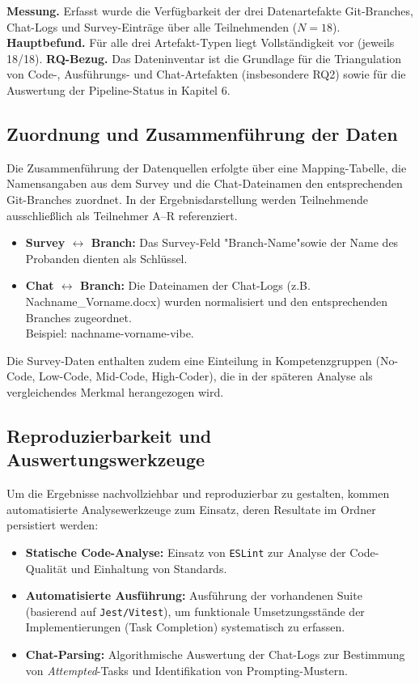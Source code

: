 \noindent \textbf{Messung.} Erfasst wurde die Verfügbarkeit der drei Datenartefakte Git-Branches, Chat-Logs und Survey-Einträge über alle Teilnehmenden ($N=18$).
\noindent \textbf{Hauptbefund.} Für alle drei Artefakt-Typen liegt Vollständigkeit vor (jeweils 18/18).
\noindent \textbf{RQ-Bezug.} Das Dateninventar ist die Grundlage für die Triangulation von Code-, Ausführungs- und Chat-Artefakten (insbesondere RQ2) sowie für die Auswertung der Pipeline-Status in Kapitel 6.

\subsection{Zuordnung und Zusammenführung der Daten}
Die Zusammenführung der Datenquellen erfolgte über eine Mapping-Tabelle, die Namensangaben aus dem Survey und die Chat-Dateinamen den entsprechenden Git-Branches zuordnet. In der Ergebnisdarstellung werden Teilnehmende ausschließlich als Teilnehmer A--R referenziert.
\begin{itemize}
    \item  \textbf{Survey $\leftrightarrow$ Branch:} Das Survey-Feld "Branch-Name"sowie der Name des Probanden dienten als Schlüssel.
    \item  \textbf{Chat $\leftrightarrow$ Branch:} Die Dateinamen der Chat-Logs (z.B. Nachname\_Vorname.docx) wurden normalisiert und den entsprechenden Branches zugeordnet.\\
    Beispiel: nachname-vorname-vibe.
\end{itemize}
Die Survey-Daten enthalten zudem eine Einteilung in Kompetenzgruppen (No-Code, Low-Code, Mid-Code, High-Coder), die in der späteren Analyse als vergleichendes Merkmal herangezogen wird.

\subsection{Reproduzierbarkeit und Auswertungswerkzeuge}
Um die Ergebnisse nachvollziehbar und reproduzierbar zu gestalten, kommen automatisierte Analysewerkzeuge zum Einsatz, deren Resultate im Ordner  persistiert werden:

\begin{itemize}
    \item  \textbf{Statische Code-Analyse:} Einsatz von \texttt{ESLint} zur Analyse der Code-Qualität und Einhaltung von Standards.
    \item  \textbf{Automatisierte Ausführung:} Ausführung der vorhandenen Suite (basierend auf \texttt{Jest/Vitest}), um funktionale Umsetzungsstände der Implementierungen (Task Completion) systematisch zu erfassen.
    \item  \textbf{Chat-Parsing:} Algorithmische Auswertung der Chat-Logs zur Bestimmung von \textit{Attempted}-Tasks und Identifikation von Prompting-Mustern.
\end{itemize}

